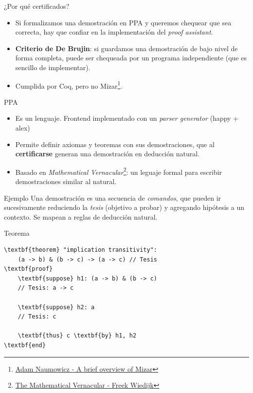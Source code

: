\documentclass[xcolor={dvipsnames},spanish]{beamer}
\begin{document}
\begin{frame}{¿Por qué certificados?}

    \begin{itemize}
        \item Si formalizamos una demostración en PPA y queremos chequear que sea correcta, hay que confiar en la implementación del \textit{proof assistant}.
        \item \textbf{Criterio de De Brujin}: si guardamos una demostración de bajo nivel de forma completa, puede ser chequeada por un programa independiente (que es sencillo de implementar).
        \item Cumplida por Coq, pero no Mizar\footnote{\href{https://www.researchgate.net/publication/225341870_A_Brief_Overview_of_Mizar}{Adam Naumowicz - A brief overview of Mizar}}.
    \end{itemize}

\end{frame}

\begin{frame}{PPA}
    \begin{itemize}
        \item Es un lenguaje. Frontend implementado con un \textit{parser generator} (happy + alex)
        \item Permite definir axiomas y teoremas con sus demostraciones, que al \textbf{certificarse} generan una demostración en deducción natural.
        \item Basado en \textit{Mathematical Vernacular}\footnote{\href{https://www.cs.ru.nl/~freek/notes/mv.pdf}{The Mathematical Vernacular - Freek Wiedijk}}: un leguaje formal para escribir demostraciones similar al natural.
    \end{itemize}
\end{frame}


\begin{frame}[fragile]{Ejemplo}
    Una demostración es una secuencia de \textit{comandos}, que pueden ir sucesivamente reduciendo la \textit{tesis} (objetivo a probar) y agregando hipótesis a un contexto. Se mapean a reglas de deducción natural.

\begin{block}{Teorema}
    \begin{Verbatim}[commandchars=\\\{\}]
\textbf{theorem} "implication transitivity":
    (a -> b) & (b -> c) -> (a -> c) // Tesis
\textbf{proof}        
    \textbf{suppose} h1: (a -> b) & (b -> c)
    // Tesis: a -> c
    
    \textbf{suppose} h2: a
    // Tesis: c
    
    \textbf{thus} c \textbf{by} h1, h2
\textbf{end}
\end{Verbatim}

\end{block}
\end{frame}
\end{document}
